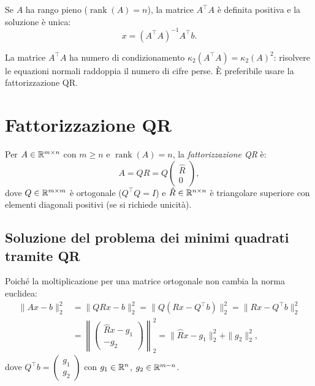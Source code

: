 Se $A$ ha rango pieno ($\operatorname{rank}(A) = n$), la matrice $A^\top A$ è
definita positiva e la soluzione è unica:
\begin{equation}
  x = (A^\top A)^{-1} A^\top b.
  \label{eq:sol_mq}
\end{equation}

\begin{remark}
La matrice $A^\top A$ ha numero di condizionamento $\kappa_2(A^\top A) =
\kappa_2(A)^2$: risolvere le equazioni normali raddoppia il numero di cifre
perse. È preferibile usare la fattorizzazione QR.
\end{remark}

\section{Fattorizzazione QR}
\label{sec:qr}

\begin{definition}[Fattorizzazione QR]
Per $A \in \mathbb{R}^{m \times n}$ con $m \geq n$ e $\operatorname{rank}(A) = n$, la
\emph{fattorizzazione QR} è:
\begin{equation}
  A = QR = Q \begin{pmatrix} \hat{R} \\ 0 \end{pmatrix},
  \label{eq:QR}
\end{equation}
dove $Q \in \mathbb{R}^{m \times m}$ è ortogonale ($Q^\top Q = I$) e
$\hat{R} \in \mathbb{R}^{n \times n}$ è triangolare superiore con elementi diagonali
positivi (se si richiede unicità).
\end{definition}

\subsection{Soluzione del problema dei minimi quadrati tramite QR}

Poiché la moltiplicazione per una matrice ortogonale non cambia la norma
euclidea:
\begin{align}
  \|Ax - b\|_2^2 &= \|QRx - b\|_2^2 = \|Q(Rx - Q^\top b)\|_2^2
                  = \|Rx - Q^\top b\|_2^2 \nonumber \\
  &= \left\|\begin{pmatrix}\hat{R}x - g_1 \\ -g_2\end{pmatrix}\right\|_2^2
   = \|\hat{R}x - g_1\|_2^2 + \|g_2\|_2^2,
  \label{eq:mq_qr}
\end{align}
dove $Q^\top b = \begin{pmatrix}g_1 \\ g_2\end{pmatrix}$ con
$g_1 \in \mathbb{R}^n$, $g_2 \in \mathbb{R}^{m-n}$.

